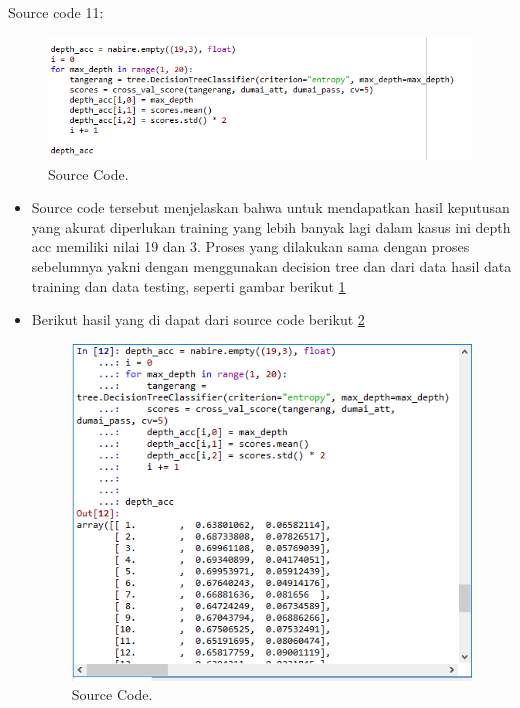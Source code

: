 Source code 11:
		\begin{figure}[ht]
		\centerline{\includegraphics[width=1\textwidth]{figures/im/imQ11.png}}
		\caption{Source Code.}
		\label{sebelasQ}
		\end{figure}
\begin{itemize}
\item Source code tersebut menjelaskan bahwa untuk mendapatkan hasil keputusan yang akurat diperlukan training yang lebih banyak lagi dalam kasus ini depth acc  memiliki nilai 19 dan 3. Proses yang dilakukan sama dengan proses sebelumnya yakni dengan menggunakan decision tree dan dari data hasil data training dan data testing, seperti gambar berikut \ref{sebelasQ}
\item Berikut hasil yang di dapat dari source code berikut \ref{sebelasC}
		\begin{figure}[ht]
		\centerline{\includegraphics[width=1\textwidth]{figures/im/imCode11.png}}
		\caption{Source Code.}
		\label{sebelasC}
		\end{figure}
\end{itemize}

